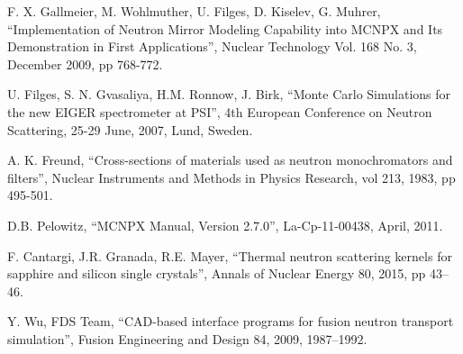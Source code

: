 \documentclass[a4paper,
              ]{jacow}
\begin{document}
\begin{thebibliography}{9}   %

  F. X. Gallmeier, M. Wohlmuther, U. Filges, D. Kiselev, G. Muhrer,
  ``Implementation of Neutron Mirror Modeling Capability into MCNPX and Its Demonstration in First Applications'',
  Nuclear Technology Vol. 168 No. 3, December 2009, pp 768-772. 

  U. Filges, S. N. Gvasaliya, H.M. Ronnow, J. Birk,
  ``Monte Carlo Simulations for the new EIGER spectrometer at PSI'',
  4th European Conference on Neutron Scattering, 25-29 June, 2007, Lund, Sweden. 

A. K. Freund,
``Cross-sections of materials used as neutron monochromators and filters'',
Nuclear Instruments and Methods in Physics Research, vol 213, 1983, pp 495-501.

   D.B. Pelowitz,
   ``MCNPX Manual, Version 2.7.0'',
   La-Cp-11-00438, April, 2011.

  F. Cantargi, J.R. Granada, R.E. Mayer, 
  ``Thermal neutron scattering kernels for sapphire and silicon single crystals'', 
  Annals of Nuclear Energy 80, 2015, pp 43–46.  

  Y. Wu, FDS Team, 
  ``CAD-based interface programs for fusion neutron transport simulation'', 
  Fusion Engineering and Design 84, 2009, 1987–1992. \\

\end{thebibliography}
\end{document}
